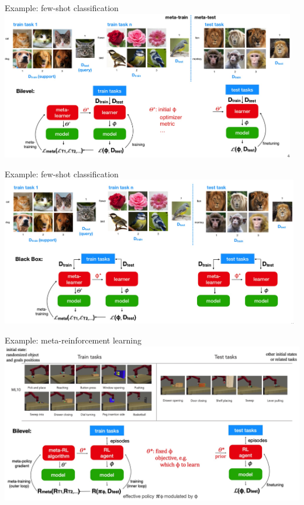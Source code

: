 \documentclass[aspectratio=169,t,handout,xcolor={usenames,dvipsnames}]{beamer}
\begin{document}
\begin{frame}{Example: few-shot classification}
    \centering\includegraphics[height=6.5cm]{image/Jietu20220329-003052.jpg}
\end{frame}

\begin{frame}{Example: few-shot classification}
    \centering\includegraphics[height=6.5cm]{image/Jietu20220329-003340.jpg}
\end{frame}

\begin{frame}{Example: meta-reinforcement learning}
    \centering\includegraphics[height=7cm]{image/Jietu20220329-003718.jpg}
\end{frame}
\end{document}
